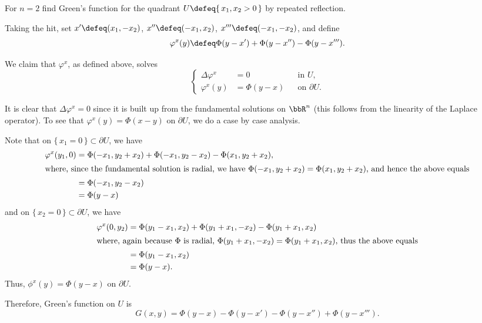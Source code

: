 \begin{problem}
  For \(n=2\) find Green's function for the quadrant
  \(U\defeq\{\,x_1,x_2>0\,\}\) by repeated reflection.
\end{problem}
\begin{solution}
  Taking the hit, set \(x'\defeq(x_1,-x_2)\), \(x''\defeq(-x_1,x_2)\),
  \(x'''\defeq(-x_1,-x_2)\), and define
  \begin{equation}
    \label{eq:6:corrector}
    \varphi^x(y)\defeq\Phi(y-x')+\Phi(y-x'')-\Phi(y-x''').
  \end{equation}

  We claim that \(\varphi^x\), as defined above, solves
  \[
    \left\{
      \begin{aligned}
        \Delta\varphi^x&=0&&\text{in \(U\),}\\
        \varphi^x(y)&=\Phi(y-x)&&\text{on \(\partial U\).}
      \end{aligned}
    \right.
  \]

  It is clear that \(\Delta\varphi^x=0\) since it is built up from the
  fundamental solutions on \(\bbR^n\) (this follows from the linearity of
  the Laplace operator). To see that \(\varphi^x(y)=\Phi(x-y)\) on
  \(\partial U\), we do a case by case analysis.

  Note that on \(\{\,x_1=0\,\}\subset\partial U\), we have
  \begin{align*}
    \varphi^x(y_1,0)
    &=\Phi(-x_1,y_2+x_2)+\Phi(-x_1,y_2-x_2)-\Phi(x_1,y_2+x_2),\\
    \intertext{where, since the fundamental solution is radial, we have
    \(\Phi(-x_1,y_2+x_2)=\Phi(x_1,y_2+x_2)\), and hence the above equals}
    &=\Phi(-x_1,y_2-x_2)\\
    &=\Phi(y-x)
  \end{align*}
  and on \(\{\,x_2=0\,\}\subset\partial U\), we have
  \begin{align*}
    \varphi^x(0,y_2)
    &=\Phi(y_1-x_1,x_2)+\Phi(y_1+x_1,-x_2)-\Phi(y_1+x_1,x_2)\\
    \intertext{where, again because \(\Phi\) is radial,
    \(\Phi(y_1+x_1,-x_2)=\Phi(y_1+x_1,x_2)\), thus the above equals}
    &=\Phi(y_1-x_1,x_2)\\
    &=\Phi(y-x).
  \end{align*}
  Thus, \(\phi^x(y)=\Phi(y-x)\) on \(\partial U\).

  Therefore, Green's function on \(U\) is
  \[
    G(x,y)=\Phi(y-x)-\Phi(y-x')-\Phi(y-x'')+\Phi(y-x''').
  \]
\end{solution}
\newpage

